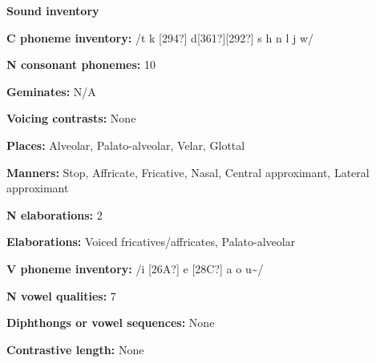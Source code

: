\begin{styleBody}
\textbf{Sound inventory}
\end{styleBody}

\begin{styleBody}
\textbf{C phoneme inventory:} /t k [294?] d[361?][292?] s h n l j w/
\end{styleBody}

\begin{styleBody}
\textbf{N consonant phonemes:} 10
\end{styleBody}

\begin{styleBody}
\textbf{Geminates:} N/A
\end{styleBody}

\begin{styleBody}
\textbf{Voicing contrasts:} None
\end{styleBody}

\begin{styleBody}
\textbf{Places: }Alveolar, Palato-alveolar, Velar, Glottal
\end{styleBody}

\begin{styleBody}
\textbf{Manners:} Stop, Affricate, Fricative, Nasal, Central approximant, Lateral approximant
\end{styleBody}

\begin{styleBody}
\textbf{N elaborations:} 2
\end{styleBody}

\begin{styleBody}
\textbf{Elaborations:} Voiced fricatives/affricates, Palato-alveolar
\end{styleBody}

\begin{styleBody}
\textbf{V phoneme inventory:} /i [26A?] e [28C?] a o u\~{ }/
\end{styleBody}

\begin{styleBody}
\textbf{N vowel qualities:} 7
\end{styleBody}

\begin{styleBody}
\textbf{Diphthongs or vowel sequences:} None
\end{styleBody}

\begin{styleBody}
\textbf{Contrastive length:} None
\end{styleBody}


